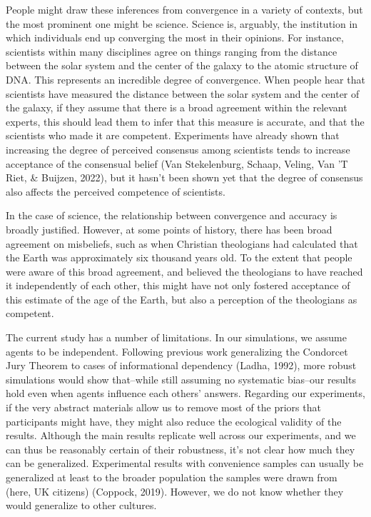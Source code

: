 \documentclass[
  doc,floatsintext]{apa6}
\begin{document}
People might draw these inferences from convergence in a variety of contexts, but the most prominent one might be science. Science is, arguably, the institution in which individuals end up converging the most in their opinions. For instance, scientists within many disciplines agree on things ranging from the distance between the solar system and the center of the galaxy to the atomic structure of DNA. This represents an incredible degree of convergence. When people hear that scientists have measured the distance between the solar system and the center of the galaxy, if they assume that there is a broad agreement within the relevant experts, this should lead them to infer that this measure is accurate, and that the scientists who made it are competent. Experiments have already shown that increasing the degree of perceived consensus among scientists tends to increase acceptance of the consensual belief (Van Stekelenburg, Schaap, Veling, Van 'T Riet, \& Buijzen, 2022), but it hasn't been shown yet that the degree of consensus also affects the perceived competence of scientists.

In the case of science, the relationship between convergence and accuracy is broadly justified. However, at some points of history, there has been broad agreement on misbeliefs, such as when Christian theologians had calculated that the Earth was approximately six thousand years old. To the extent that people were aware of this broad agreement, and believed the theologians to have reached it independently of each other, this might have not only fostered acceptance of this estimate of the age of the Earth, but also a perception of the theologians as competent.

The current study has a number of limitations. In our simulations, we assume agents to be independent. Following previous work generalizing the Condorcet Jury Theorem to cases of informational dependency (Ladha, 1992), more robust simulations would show that--while still assuming no systematic bias--our results hold even when agents influence each others' answers. Regarding our experiments, if the very abstract materials allow us to remove most of the priors that participants might have, they might also reduce the ecological validity of the results. Although the main results replicate well across our experiments, and we can thus be reasonably certain of their robustness, it's not clear how much they can be generalized. Experimental results with convenience samples can usually be generalized at least to the broader population the samples were drawn from (here, UK citizens) (Coppock, 2019). However, we do not know whether they would generalize to other cultures.
\end{document}
